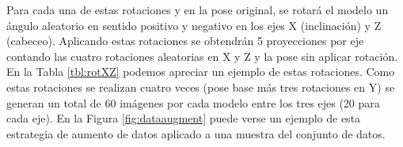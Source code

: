 \begin{table}[ht!]
  \centering
  \caption{Rotaciones en el eje Y de una muestra del conjunto de datos.}
  \label{tbl:rotY}
\end{table}

Para cada una de estas rotaciones y en la pose original, se rotará el modelo un ángulo aleatorio en sentido positivo y negativo en los ejes X (inclinación) y Z (cabeceo). Aplicando estas rotaciones se obtendrán 5 proyecciones por eje contando las cuatro rotaciones aleatorias en X y Z y la pose sin aplicar rotación. En la Tabla \ref{tbl:rotXZ} podemos apreciar un ejemplo de estas rotaciones. Como estas rotaciones se realizan cuatro veces (pose base más tres rotaciones en Y) se generan un total de 60 imágenes por cada modelo entre los tres ejes (20 para cada eje). En la Figura \ref{fig:dataaugment} puede verse un ejemplo de esta estrategia de aumento de datos aplicado a una muestra del conjunto de datos.

